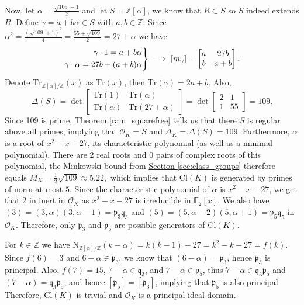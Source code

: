 \documentclass[openany, a4paper, 10pt]{book}
\theoremstyle{plain}
\theoremstyle{plain}
\theoremstyle{plain}
\theoremstyle{definition}
\theoremstyle{plain}
\theoremstyle{definition}
\theoremstyle{remark}
\newcommand{\theoref}[1]{\hyperref[#1]{Theorem \ref{#1}}}
\newcommand{\secref}[1]{\hyperref[#1]{Section \ref{#1}}}
\newenvironment{rcases}{\left.\begin{aligned}}{\end{aligned}\right\rbrace}
\begin{document}
Now, let $\alpha = \frac{\sqrt{109}+1}{2}$ and let $S = \mathbb Z[\alpha]$, we know that $R \subset S$ so $S$ indeed extends $R$.
Define $\gamma = a + b\alpha \in S$ with $a, b \in \mathbb Z$.
Since $\alpha^2 = \frac{(\sqrt{109}+1)^2}{4} = \frac{55+\sqrt{109}}{2} = 27 + \alpha$
we have
\begin{equation*}
    \begin{rcases}
        \gamma \cdot 1 = a + b \alpha \\
        \gamma \cdot \alpha = 27b + (a+b) \alpha
    \end{rcases}
    \implies
    [m_\gamma] =
    \begin{bmatrix}
        a & 27b \\
        b & a+b
    \end{bmatrix}.
\end{equation*}
Denote $\mathrm{Tr}_{\mathbb Z[\alpha] / \mathbb Z}(x)$ as $\mathrm{Tr}(x)$, then $\mathrm{Tr}(\gamma) = 2a + b$.
Also,
\begin{equation*}
    \Delta(S) = \det \begin{bmatrix} \mathrm{Tr}(1) & \mathrm{Tr}(\alpha) \\ \mathrm{Tr}(\alpha) & \mathrm{Tr}(27+\alpha) \end{bmatrix}
    = \det \begin{bmatrix} 2 & 1 \\ 1 & 55 \end{bmatrix} = 109.
\end{equation*}
Since 109 is prime, \theoref{ram_squarefree} tells us that there $S$ is regular above all primes, implying that $\mathcal O_K = S$ and $\Delta_K = \Delta(S) = 109$.
Furthermore, $\alpha$ is a root of $x^2-x-27$, its characteristic polynomial (as well as a minimal polynomial).
There are 2 real roots and 0 pairs of complex roots of this polynomial, the Minkowski bound from \secref{sec:class_groups} therefore equals
$M_K = \frac{1}{2} \sqrt{109} \approx 5.22,$
which implies that $\mathrm{Cl}(K)$ is generated by primes of norm at most $5$.
Since the characteristic polynomial of $\alpha$ is $x^2-x-27$, we get that
$2$ in inert in $\mathcal O_K$ as $x^2-x-27$ is irreducible in $\mathbb F_2[x]$.
We also have $(3) = (3, \alpha) (3, \alpha-1) = \mathfrak p_3 \mathfrak q_3$
and $(5) = (5, \alpha-2)(5, \alpha+1) = \mathfrak p_5 \mathfrak q_5$ in $\mathcal O_K$.
Therefore, only $\mathfrak p_3$ and $\mathfrak p_5$ are possible generators of $\mathrm{Cl}(K)$.

For $k \in \mathbb Z$ we have $\mathrm{N}_{\mathbb Z[\alpha] / \mathbb Z}(k-\alpha) = k(k-1) - 27 = k^2 - k - 27 = f(k)$.
Since $f(6) = 3$ and $6-\alpha \in \mathfrak p_3$, we know that $(6-\alpha) = \mathfrak p_3$, hence $\mathfrak p_3$ is principal.
Also, $f(7)=15$, $7-\alpha \in \mathfrak q_3$, and $7-\alpha \in \mathfrak p_5$, thus $7-\alpha \in \mathfrak q_3\mathfrak p_5$
and $(7-\alpha) = \mathfrak q_3 \mathfrak p_5$, and hence $[\mathfrak p_5] = [\mathfrak p_3]$, implying that $\mathfrak p_5$ is also principal.
Therefore, $\mathrm{Cl}(K)$ is trivial and $\mathcal O_K$ is a principal ideal domain.
\end{document}
